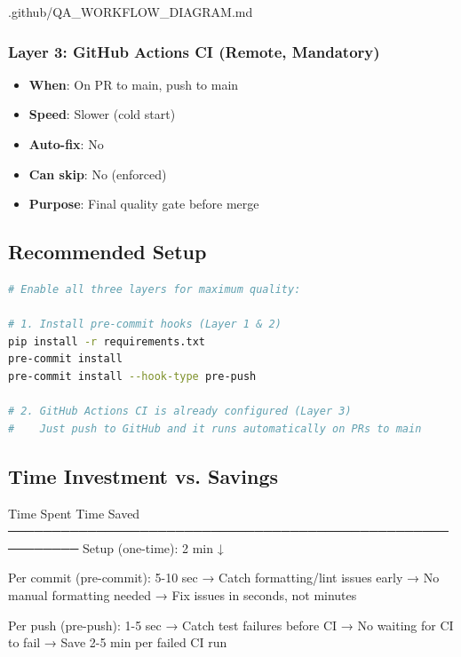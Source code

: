 \begin{relocated}{.github/QA_WORKFLOW_DIAGRAM.md}
\subsubsection{Layer 3: GitHub Actions CI (Remote, Mandatory)}\label{um:flow:qa-workflow-diagram:layer-3-github-actions-ci-remote-mandatory}

\begin{itemize}
\tightlist
\item
  \textbf{When}: On PR to main, push to main
\item
  \textbf{Speed}: Slower (cold start)
\item
  \textbf{Auto-fix}: No
\item
  \textbf{Can skip}: No (enforced)
\item
  \textbf{Purpose}: Final quality gate before merge
\end{itemize}

\subsection{Recommended Setup}\label{um:flow:qa-workflow-diagram:recommended-setup}

\begin{lstlisting}[language=bash]
# Enable all three layers for maximum quality:

# 1. Install pre-commit hooks (Layer 1 & 2)
pip install -r requirements.txt
pre-commit install
pre-commit install --hook-type pre-push

# 2. GitHub Actions CI is already configured (Layer 3)
#    Just push to GitHub and it runs automatically on PRs to main
\end{lstlisting}

\subsection{Time Investment vs. Savings}\label{um:flow:qa-workflow-diagram:time-investment-vs-savings}

\begin{textblock}
Time Spent                          Time Saved
──────────────────────────────────────────────────────────
Setup (one-time): 2 min            ↓

Per commit (pre-commit): 5-10 sec  → Catch formatting/lint issues early
                                   → No manual formatting needed
                                   → Fix issues in seconds, not minutes

Per push (pre-push): 1-5 sec       → Catch test failures before CI
                                   → No waiting for CI to fail
                                   → Save 2-5 min per failed CI run


\end{textblock}
\end{relocated}
